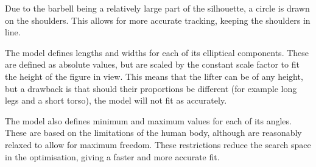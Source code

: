 Due to the barbell being a relatively large part of the silhouette, a circle is drawn on the shoulders. This allows for more accurate tracking, keeping the shoulders in line.

The model defines lengths and widths for each of its elliptical components. These are defined as absolute values, but are scaled by the constant scale factor to fit the height of the figure in view. This means that the lifter can be of any height, but a drawback is that should their proportions be different (for example long legs and a short torso), the model will not fit as accurately.

The model also defines minimum and maximum values for each of its angles. These are based on the limitations of the human body, although are reasonably relaxed to allow for maximum freedom. These restrictions reduce the search space in the optimisation, giving a faster and more accurate fit.
